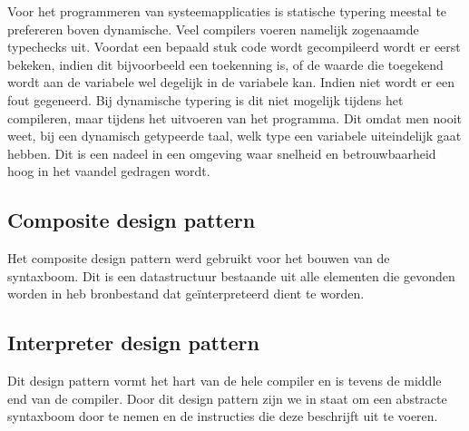\documentclass[12pt,a4paper]{article}
\begin{document}
Voor het programmeren van systeemapplicaties is statische typering meestal te prefereren boven dynamische. Veel compilers voeren namelijk zogenaamde typechecks uit. Voordat een bepaald stuk code wordt gecompileerd wordt er eerst bekeken, indien dit bijvoorbeeld een toekenning is, of de waarde die toegekend wordt aan de variabele wel degelijk in de variabele kan. Indien niet wordt er een fout gegeneerd. Bij dynamische typering is dit niet mogelijk tijdens het compileren, maar tijdens het uitvoeren van het programma. Dit omdat men nooit weet, bij een dynamisch getypeerde taal, welk type een variabele uiteindelijk gaat hebben. Dit is een nadeel in een omgeving waar snelheid en betrouwbaarheid hoog in het vaandel gedragen wordt. 

\subsection{Composite design pattern}
Het composite design pattern werd gebruikt voor het bouwen van de syntaxboom. Dit is een datastructuur bestaande uit alle elementen die gevonden worden in heb bronbestand dat geïnterpreteerd dient te worden.

\subsection{Interpreter design pattern}
Dit design pattern vormt het hart van de hele compiler en is tevens de middle end van de compiler. Door dit design pattern zijn we in staat om een abstracte syntaxboom door te nemen en de instructies die deze beschrijft uit te voeren.
\end{document}
